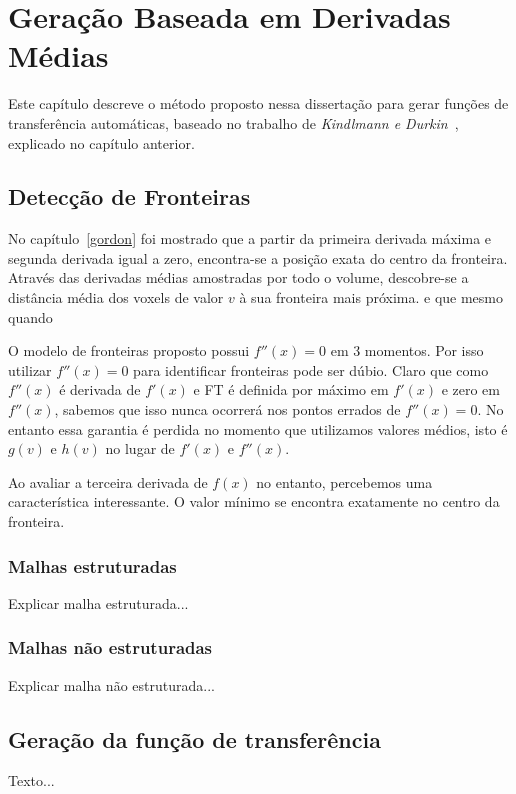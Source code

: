 
\chapter{Geração Baseada em Derivadas Médias}
\label{my}
	Este capítulo descreve o método proposto nessa dissertação para gerar funções de transferência automáticas, baseado no trabalho de \textit{Kindlmann e Durkin}~\cite{gordon}, explicado no capítulo anterior.

\section{Detecção de Fronteiras}
\label{my.deriv}
	No capítulo~\ref{gordon} foi mostrado que a partir da primeira derivada máxima e segunda derivada igual a zero, encontra-se a posição exata do centro da fronteira. Através das derivadas médias amostradas por todo o volume, descobre-se a distância média dos voxels de valor $ v $ à sua fronteira mais próxima. e que mesmo quando 
	
	O modelo de fronteiras proposto possui $ f''(x) = 0 $ em 3 momentos. Por isso utilizar $ f''(x) = 0 $ para identificar fronteiras pode ser dúbio. Claro que como $ f''(x) $ é derivada de $ f'(x) $ e FT é definida por máximo em $ f'(x) $ e zero em $ f''(x) $, sabemos que isso nunca ocorrerá nos pontos errados de $ f''(x) = 0 $. No entanto essa garantia é perdida no momento que utilizamos valores médios, isto é $ g(v) $ e $ h(v) $ no lugar de $ f'(x) $ e $ f''(x) $.
	
	Ao avaliar a terceira derivada de $ f(x) $ no entanto, percebemos uma característica interessante. O valor mínimo se encontra exatamente no centro da fronteira.
    
\subsection{Malhas estruturadas}
\label{my.struct}
	Explicar malha estruturada...

\subsection{Malhas não estruturadas}
\label{my.nonstruct}
	Explicar malha não estruturada...

\section{Geração da função de transferência}
\label{my.tf}
	Texto...